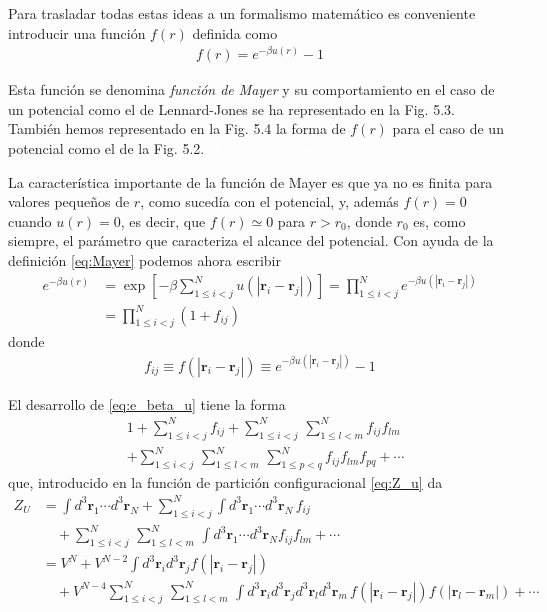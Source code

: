 Para trasladar todas estas ideas a un formalismo matemático es conveniente introducir una función $f(r)$ definida como
\begin{eqnarray}\label{eq:Mayer}
	f(r) = e^{-\beta u(r)} - 1
\end{eqnarray}

Esta función se denomina \emph{función de Mayer} y su comportamiento en el caso de un potencial como el de Lennard-Jones se ha representado en la Fig. 5.3. También hemos representado en la Fig. 5.4 la forma de $f(r)$ para el caso de un potencial como el de la Fig. 5.2. \colorbox{red!60}{\textcolor{white}{\textit{[Figuras a rellenar :D]}}}

La característica importante de la función de Mayer es que ya no es finita para valores pequeños de $r$, como sucedía con el potencial, y, además $f(r) = 0$ cuando $u(r) = 0$, es decir, que $f(r) \simeq 0$ para $r > r_0$, donde $r_0$ es, como siempre, el parámetro que caracteriza el alcance del potencial.
Con ayuda de la definición \eqref{eq:Mayer} podemos ahora escribir
\begin{align}\label{eq:e_beta_u}
	e^{-\beta u(r)} &= \exp \left[ -\beta \sum_{1 \leq i < j}^{N} u(|\mathbf{r}_i - \mathbf{r}_j|) \right] = \prod_{1 \leq i < j}^{N} e^{-\beta u(|\mathbf{r}_i - \mathbf{r}_j|)} \nonumber\\
					&= \prod_{1 \leq i < j}^{N} (1+f_{ij})
\end{align}
donde
\begin{eqnarray}
	f_{ij} \equiv f(|\mathbf{r}_i - \mathbf{r}_j|) \equiv e^{-\beta u(|\mathbf{r}_i - \mathbf{r}_j|)} - 1 
\end{eqnarray}

El desarrollo de \eqref{eq:e_beta_u} tiene la forma
\begin{align}\label{eq:des_e_beta_u}
	&1 + \sum_{1 \leq i < j}^{N} f_{ij} + \sum_{1 \leq i < j}^{N} \, \sum_{1 \leq l < m}^{N} f_{ij} f_{lm} \nonumber \\
	&+ \sum_{1 \leq i < j}^{N} \, \sum_{1 \leq l < m}^{N} \, \sum_{1 \leq p < q}^{N} f_{ij} f_{lm} f_{pq} + \cdots
\end{align}
que, introducido en la función de partición configuracional \eqref{eq:Z_u} da
\begin{align}\label{eq:z_u_2}
	Z_U &= \int d^3\mathbf{r}_1 \cdots d^3\mathbf{r}_N + \sum_{1 \leq i < j}^{N} \int d^3\mathbf{r}_1 \cdots d^3\mathbf{r}_N\, f_{ij} \nonumber \\
		& \quad + \sum_{1 \leq i < j}^{N} \, \sum_{1 \leq l < m}^{N} \, \int d^3\mathbf{r}_1 \cdots d^3\mathbf{r}_Nf_{ij} f_{lm} + \cdots \nonumber \\
		&= V^N + V^{N-2} \int d^3\mathbf{r}_i d^3\mathbf{r}_j f(|\mathbf{r}_i - \mathbf{r}_j|)  \nonumber \\
		& \quad + V^{N-4} \sum_{1 \leq i < j}^{N} \,  \sum_{1 \leq l < m}^{N} \, \int d^3\mathbf{r}_i d^3\mathbf{r}_j d^3\mathbf{r}_l  d^3\mathbf{r}_m \, f(|\mathbf{r}_i - \mathbf{r}_j|) f(|\mathbf{r}_l - \mathbf{r}_m|) + \cdots
\end{align}

